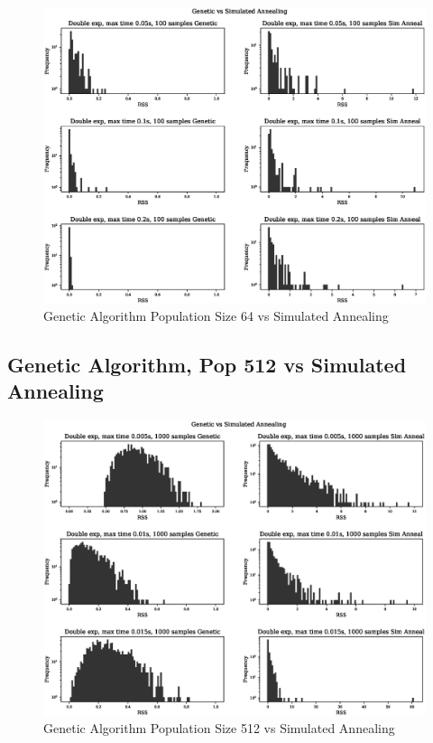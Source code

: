 \begin{figure}[h]
  \begin{center}
    \includegraphics[width=15.0cm]{appendix/sim_anneal_genetic/pop_64/plot_name_11.eps}
    \caption{Genetic Algorithm Population Size 64 vs Simulated Annealing}
    \label{fig:ga_vs_sim_64_3}
  \end{center}
\end{figure}


\FloatBarrier
\subsection{Genetic Algorithm, Pop 512 vs Simulated Annealing}

\begin{figure}[h]
  \begin{center}
    \includegraphics[width=15.0cm]{appendix/sim_anneal_genetic/pop_512/plot_name_9.eps}
    \caption{Genetic Algorithm Population Size 512 vs Simulated Annealing}
    \label{fig:ga_vs_sim_512_1}
  \end{center}
\end{figure}

